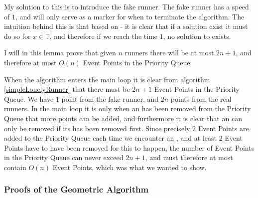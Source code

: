 My solution to this is to introduce the fake runner. The fake runner has a speed of $1$, and will only serve as a marker for when to terminate the algorithm. The intuition behind this is that based on  - it is clear that if a solution exist it must do so for $x \in \mathbb{T}$, and therefore if we reach the time $1$, no solution to  exists.

\begin{lemma}
\label{maximum_event_points}
I will in this lemma prove that given $n$ runners there will be at most $2n + 1$, and therefore at most $O(n)$ Event Points in the Priority Queue:

When the algorithm enters the main loop it is clear from algorithm \ref{simpleLonelyRunner} that there must be $2n + 1$ Event Points in the Priority Queue. We have $1$ point from the fake runner, and $2n$ points from the real runners. In the main loop it is only when an \comEnd has been removed from the Priority Queue that more points can be added, and furthermore it is clear that an \comEnd can only be removed if its \comStart\;has been removed first. Since precisely 2 Event Points are added to the Priority Queue each time we encounter an \comEnd, and at least 2 Event Points have to have been removed for this to happen, the number of Event Points in the Priority Queue can never exceed $2n + 1$, and must therefore at most contain $O(n)$ Event Points, which was what we wanted to show.
\end{lemma}

\subsubsection{Proofs of the Geometric Algorithm}
\label{proof_geo}

